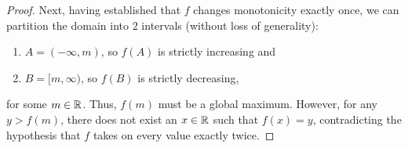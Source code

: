 \begin{problem}
\begin{proof}
    Next, having established that $f$ changes monotonicity exactly once,
    we can partition the domain into $2$ intervals (without loss of generality):
    \begin{enumerate}[label=(\roman*)]
      \item $A = (-\infty, m)$, so $f(A)$ is strictly increasing and
      \item $B = [m, \infty)$, so $f(B)$ is strictly decreasing,
    \end{enumerate}
    for some $m \in \mathbb{R}$.
    Thus, $f(m)$ must be a global maximum. However, for any $y > f(m)$, there
    does not exist an $x \in \mathbb{R}$ such that $f(x) = y$, contradicting the hypothesis that 
    $f$ takes on every value exactly twice.

  \end{proof}

\end{problem}


